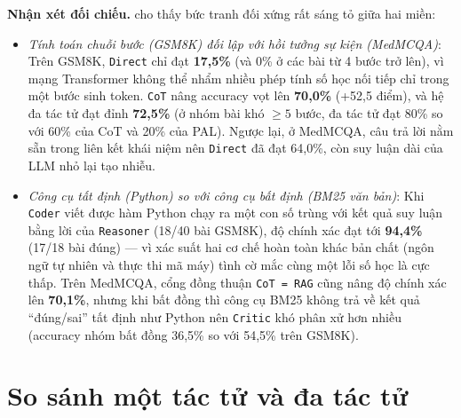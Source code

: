 \textbf{Nhận xét đối chiếu.}  cho thấy bức tranh đối xứng rất sáng tỏ giữa hai miền:
\begin{itemize}
  \item \emph{Tính toán chuỗi bước (GSM8K) đối lập với hồi tưởng sự kiện (MedMCQA)}: Trên GSM8K, \texttt{Direct} chỉ đạt \textbf{17,5\%} (và 0\% ở các bài từ 4 bước trở lên), vì mạng Transformer không thể nhẩm nhiều phép tính số học nối tiếp chỉ trong một bước sinh token. \texttt{CoT} nâng accuracy vọt lên \textbf{70,0\%} (+52,5 điểm), và hệ đa tác tử đạt đỉnh \textbf{72,5\%} (ở nhóm bài khó $\ge 5$ bước, đa tác tử đạt 80\% so với 60\% của CoT và 20\% của PAL). Ngược lại, ở MedMCQA, câu trả lời nằm sẵn trong liên kết khái niệm nên \texttt{Direct} đã đạt 64,0\%, còn suy luận dài của LLM nhỏ lại tạo nhiễu.
  \item \emph{Công cụ tất định (Python) so với công cụ bất định (BM25 văn bản)}: Khi \texttt{Coder} viết được hàm Python chạy ra một con số trùng với kết quả suy luận bằng lời của \texttt{Reasoner} (18/40 bài GSM8K), độ chính xác đạt tới \textbf{94,4\%} (17/18 bài đúng) — vì xác suất hai cơ chế hoàn toàn khác bản chất (ngôn ngữ tự nhiên và thực thi mã máy) tình cờ mắc cùng một lỗi số học là cực thấp. Trên MedMCQA, cổng đồng thuận \texttt{CoT = RAG} cũng nâng độ chính xác lên \textbf{70,1\%}, nhưng khi bất đồng thì công cụ BM25 không trả về kết quả ``đúng/sai'' tất định như Python nên \texttt{Critic} khó phân xử hơn nhiều (accuracy nhóm bất đồng 36,5\% so với 54,5\% trên GSM8K).
\end{itemize}

\section{So sánh một tác tử và đa tác tử}

